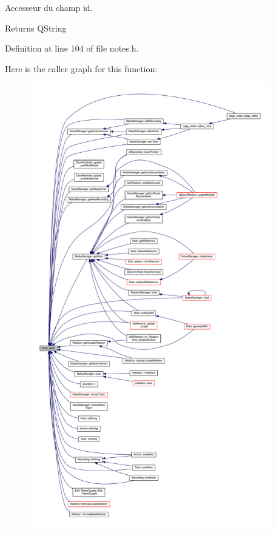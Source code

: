 Accesseur du champ id. 

\begin{DoxyReturn}{Returns}
Q\+String 
\end{DoxyReturn}


Definition at line 104 of file notes.\+h.

Here is the caller graph for this function\+:\nopagebreak
\begin{figure}[H]
\begin{center}
\leavevmode
\includegraphics[height=550pt]{class_note_afafbebe4aa35b8d29d903bc53fa31929_icgraph}
\end{center}
\end{figure}
\mbox{\label{class_note_a3ff22c94b72b8c5cb93638bd16262d0d}} 
